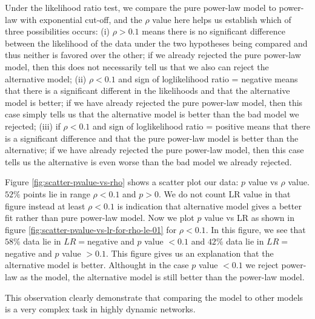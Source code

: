 \documentclass[10pt,conference,letterpaper]{IEEEtran}
\begin{document}
Under the likelihood ratio test, we compare the pure power-law model to power-law with exponential cut-off, and the $\rho$ value here helps us establish which of three possibilities occurs: (i) $\rho > 0.1$ means there is no significant difference between the likelihood of the data under the two hypotheses being compared and thus neither is favored over the other; if we already rejected the pure power-law model, then this does not necessarily tell us that we also can reject the alternative model; (ii) $\rho  < 0.1$ and sign of loglikelihood ratio = negative means that there is a significant different in the likelihoods and that the alternative model is better; if we have already rejected the pure power-law model, then this case simply tells us that the alternative model is better than the bad model we rejected; (iii) if $\rho < 0.1$ and sign of loglikelihood ratio = positive means that there is a significant difference and that the pure power-law model is better than the alternative; if we have already rejected the pure power-law model, then this case tells us the alternative is even worse than the bad model we already rejected.

Figure \ref{fig:scatter-pvalue-vs-rho} shows a scatter plot our data: $p$ value vs $\rho$ value.
$52\%$ points lie in range $\rho < 0.1$ and $p > 0$.
We do not count LR value in that figure instead at least $\rho < 0.1$ is indication that alternative model gives a better fit rather than pure power-law model.
Now we plot $p$ value vs LR as shown in figure \ref{fig:scatter-pvalue-vs-lr-for-rho-le-01} for $\rho < 0.1$. 
In this figure, we see that $58\%$ data lie in $LR=$negative and $p$ value $< 0.1$ and $42\%$ data lie in $LR=$negative and $p$ value $>0.1$.
This figure gives us an explanation that the alternative model is better. 
Althought in the case $p$ value $<0.1$ we reject power-law as the model, the alternative model is still better than the power-law model. 

This observation clearly demonstrate that comparing the model to other models is a very complex task in highly dynamic networks.
\end{document}
